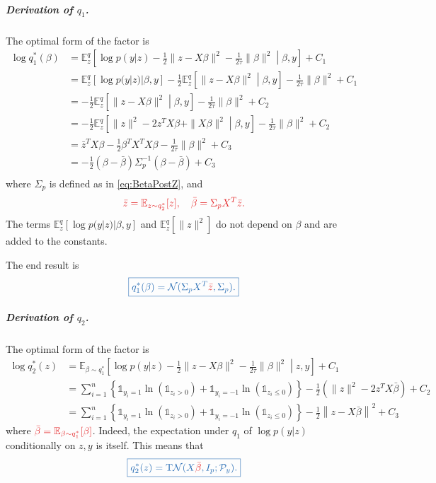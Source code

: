 \documentclass[11pt]{article}
\newcommand\EE{\mathbb{E}}
\newcommand{\calP}{\mathcal{P}}
\newcommand{\calN}{\mathcal{N}}
\newcommand{\bluefont}{\color{darkblue}}
\newcommand{\redfont}{\color{darkred}}
\begin{document}
\subparagraph{Derivation of \boldmath$q_1$.} The optimal form of the factor is
\begin{equation}
\begin{aligned}
	\log q^*_1(\beta) &= \EE^{q}_{z}\left[
		\log p(y|z) - \frac{1}{2}\|z-X\beta\|^2 - \frac{1}{2\tau} \|\beta\|^2
		\middle| \beta,y
	\right] + C_1  \\
	&= \EE^q_z [\log p(y|z) | \beta,y]
	- \frac{1}{2} \EE^q_z\left[\|z-X\beta\|^2 \middle| \beta,y\right]
	- \frac{1}{2\tau}\|\beta\|^2
	+ C_1  \\
	&= -\frac{1}{2} \EE^q_z\left[\|z-X\beta\|^2 \middle| \beta,y\right]
	- \frac{1}{2\tau}\|\beta\|^2
	+ C_2  \\
	&= -\frac{1}{2} \EE^q_z\left[\|z\|^2 - 2z^TX\beta + \|X\beta\|^2 \middle| \beta,y\right]
	- \frac{1}{2\tau}\|\beta\|^2
	+ C_2  \\
	&=
	\bar{z}^TX\beta
	-\frac{1}{2}\beta^TX^TX\beta
	-\frac{1}{2\tau}\|\beta\|^2
	+ C_3  \\
	&=
	-\frac{1}{2}
	(\beta - \bar{\beta})\Sigma_p^{-1}(\beta - \bar{\beta})
	+ C_3  \\
\end{aligned}
\end{equation}
where $\Sigma_p$ is defined as in \cref{eq:BetaPostZ}, and
\begin{equation}\label{eq:VBayesParams}
{\redfont
	\bar{z} = \EE_{z\sim q^*_2}[z], \quad
	\bar{\beta} = \Sigma_p X^T\bar{z}.
}
\end{equation}
The terms $\EE^q_z[\log p(y|z)|\beta,y]$ and $\EE^q_z\left[\|z\|^2\right]$ do not depend on $\beta$ and are added to the constants.

The end result is
\begin{equation}
\bluefont
\boxed{
	q^*_1(\beta) = \calN(\Sigma_pX^T {\redfont\bar{z}}, \Sigma_p).
}
\end{equation}


\subparagraph{Derivation of \boldmath$q_2$.} The optimal form of the factor is
\begin{equation}
\begin{aligned}
	\log q^*_2(z)
	&= \EE_{\beta\sim q^*_1}\left[
	\log p(y|z) - \frac{1}{2}\|z-X\beta\|^2 - \frac{1}{2\tau} \|\beta\|^2
	\middle| z,y
	\right] + C_1  \\
	&=
	\sum_{i=1}^n \left\{ 
		\mathds{1}_{y_i=1}\ln(\mathds{1}_{z_i > 0}) + \mathds{1}_{y_i=-1}\ln(\mathds{1}_{z_i \leq 0})
	\right\}
	-\frac{1}{2}
	\left(
		\|z\|^2 - 2z^TX\bar{\beta}
	\right)
	+ C_2  \\
	&=
	\sum_{i=1}^n \left\{ 
	\mathds{1}_{y_i=1}\ln(\mathds{1}_{z_i > 0}) + \mathds{1}_{y_i=-1}\ln(\mathds{1}_{z_i \leq 0})
	\right\}
	-\frac{1}{2}
	\left\|z - X\bar{\beta}\right\|^2
	+ C_3
\end{aligned}
\end{equation}
where $\redfont\bar{\beta} = \EE_{\beta\sim q^*_1}[\beta]$.
Indeed, the expectation under $q_1$ of $\log p(y|z)$ conditionally on $z,y$ is itself.
This means that 
\begin{equation}
\bluefont
\boxed{
	q^*_2(z) = \mathrm{T}\calN(X {\redfont\bar{\beta}}, I_p; \calP_y).
}
\end{equation}
\end{document}
